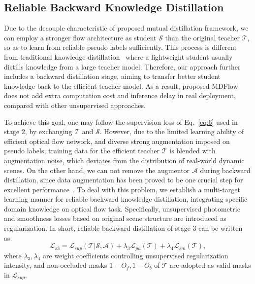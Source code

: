 \documentclass[lettersize,journal]{IEEEtran}
\begin{document}
\subsection{Reliable Backward Knowledge Distillation}
Due to the decouple characteristic of proposed mutual distillation framework, we can employ a stronger flow architecture as student $\mathcal{S}$ than the original teacher $\mathcal{T}$, so as to learn from reliable pseudo labels sufficiently. This process is different from traditional knowledge distillation~\cite{44873,aleotti2020learning} where a lightweight student usually distills knowledge from a large teacher model. Therefore, our approach further includes a backward distillation stage, aiming to transfer better student knowledge back to the efficient teacher model. As a result, proposed MDFlow does not add extra computation cost and inference delay in real deployment, compared with other unsupervised approaches.

To achieve this goal, one may follow the supervision loss of Eq.~\ref{eq:6} used in stage 2, by exchanging $\mathcal{T}$ and $\mathcal{S}$. However, due to the limited learning ability of efficient optical flow network, and diverse strong augmentation imposed on pseudo labels, training data for the efficient teacher $\mathcal{T}$ is blended with augmentation noise, which deviates from the distribution of real-world dynamic scenes. On the other hand, we can not remove the augmentor $\mathcal{A}$ during backward distillation, since data augmentation has been proved to be one crucial step for excellent performance~\cite{8621052,Bar-Haim_2020_CVPR}. To deal with this problem, we establish a multi-target learning manner for reliable backward knowledge distillation, integrating specific domain knowledge on optical flow task. Specifically, unsupervised photometric and smoothness losses based on original scene structure are introduced as regularization. In short, reliable backward distillation of stage 3 can be written as:
\begin{equation}
	\mathcal{L}_{s3} = \mathcal{L}_{sup}(\mathcal{T} | \mathcal{S}, \mathcal{A}) + \lambda_3 \mathcal{L}_{ph}(\mathcal{T}) + \lambda_4 \mathcal{L}_{sm}(\mathcal{T}),
	\label{eq:7}
\end{equation}
where $\lambda_3, \lambda_4$ are weight coefficients controlling unsupervised regularization intensity, and non-occluded masks $1-O_f, 1-O_b$ of $\mathcal{T}$ are adopted as valid masks in $\mathcal{L}_{sup}$.
\end{document}
